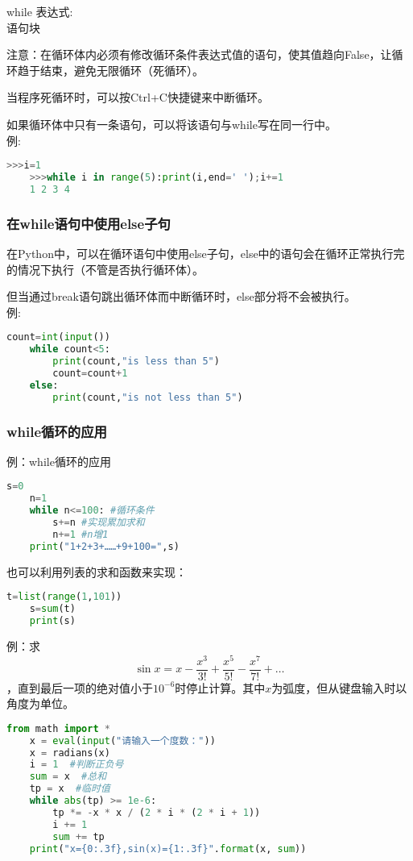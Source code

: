 \documentclass[11pt,a4paper]{article}
\begin{document}
\begin{center}
    while 表达式:\\
    语句块
\end{center}
注意：在循环体内必须有修改循环条件表达式值的语句，使其值趋向False，让循环趋于结束，避免无限循环（死循环）。

当程序死循环时，可以按Ctrl+C快捷键来中断循环。

如果循环体中只有一条语句，可以将该语句与while写在同一行中。\\
例:
\begin{lstlisting}[language={Python}]
    >>>i=1
    >>>while i in range(5):print(i,end=' ');i+=1
    1 2 3 4
\end{lstlisting}

\subsubsection{在while语句中使用else子句}

在Python中，可以在循环语句中使用else子句，else中的语句会在循环正常执行完的情况下执行（不管是否执行循环体）。

但当通过break语句跳出循环体而中断循环时，else部分将不会被执行。 \\
例:
\begin{lstlisting}[language={Python}]
    count=int(input())
    while count<5:
        print(count,"is less than 5")
        count=count+1
    else:
        print(count,"is not less than 5")
\end{lstlisting}

\subsubsection{while循环的应用}

例：while循环的应用
\begin{lstlisting}[language={Python}]
    s=0
    n=1
    while n<=100: #循环条件
        s+=n #实现累加求和
        n+=1 #n增1
    print("1+2+3+……+9+100=",s)
\end{lstlisting}
也可以利用列表的求和函数来实现：
\begin{lstlisting}[language={Python}]
    t=list(range(1,101))
    s=sum(t)
    print(s)
\end{lstlisting}

例：求$$\sin{x}=x-\frac{x^3}{3!}+\frac{x^5}{5!}-\frac{x^7}{7!}+\dots$$，直到最后一项的绝对值小于$10^{-6}$时停止计算。其中$x$为弧度，但从键盘输入时以角度为单位。
\begin{lstlisting}[language={Python}]
    from math import *
    x = eval(input("请输入一个度数："))
    x = radians(x)
    i = 1  #判断正负号
    sum = x  #总和
    tp = x  #临时值
    while abs(tp) >= 1e-6:
        tp *= -x * x / (2 * i * (2 * i + 1))
        i += 1
        sum += tp
    print("x={0:.3f},sin(x)={1:.3f}".format(x, sum))
\end{lstlisting}
\end{document}

